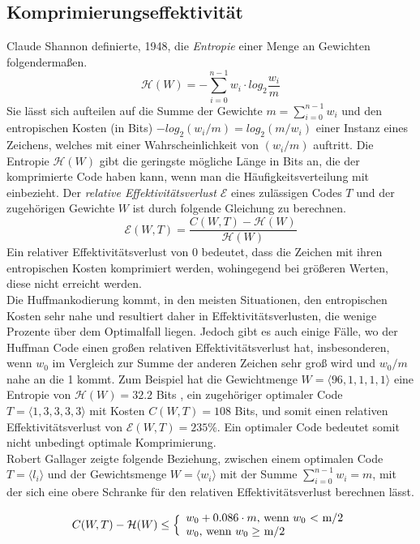 \documentclass[course=erap]{aspdoc}
\begin{document}
\subsection{Komprimierungseffektivität}

Claude Shannon definierte, 1948, die \textit{Entropie} einer Menge an Gewichten folgendermaßen. \cite{6773024}
$$ \mathcal{H}(W) = - \sum_{i=0}^{n-1} w_i \cdot log_2 \frac{w_i}{m} $$
Sie lässt sich aufteilen auf die Summe der Gewichte $m = \sum_{i=0}^{n-1} w_i$ und den entropischen Kosten (in Bits) $-log_2 (w_i/m) = log_2 (m/w_i) $ einer Instanz eines Zeichens, welches mit einer Wahrscheinlichkeit von $(w_i/m)$ auftritt.
Die Entropie $\mathcal{H}(W)$ gibt die geringste mögliche Länge in Bits an, die der komprimierte Code haben kann, wenn man die Häufigkeitsverteilung mit einbezieht.
Der \textit{relative Effektivitätsverlust} $\mathcal{E}$ eines zulässigen Codes $T$ und der zugehörigen Gewichte $W$ ist durch folgende Gleichung zu berechnen.
$$ \mathcal{E}(W, T) = \frac{C(W,T) - \mathcal{H}(W)}{\mathcal{H}(W)} $$
Ein relativer Effektivitätsverlust von 0 bedeutet, dass die Zeichen mit ihren entropischen Kosten komprimiert werden, wohingegend bei größeren Werten, diese nicht erreicht werden.\\
Die Huffmankodierung kommt, in den meisten Situationen, den entropischen Kosten sehr nahe und resultiert daher in Effektivitätsverlusten, die wenige Prozente über dem Optimalfall liegen.
Jedoch gibt es auch einige Fälle, wo der Huffman Code einen großen relativen Effektivitätsverlust hat, insbesonderen, wenn $w_0$ im Vergleich zur Summe der anderen Zeichen sehr groß wird und $w_0 / m$ nahe an die 1 kommt.
Zum Beispiel hat die Gewichtmenge $W = \langle 96, 1, 1, 1, 1 \rangle$ eine Entropie von $\mathcal{H}(W) =
32.2$ Bits , ein zugehöriger optimaler Code $T = \langle 1, 3, 3, 3, 3 \rangle$ mit Kosten $C(W ,T) = 108 $ Bits, und somit einen
relativen Effektivitätsverlust von $\mathcal{E}(W ,T ) = 235\%$. Ein optimaler Code bedeutet somit nicht unbedingt optimale Komprimierung.\\
Robert Gallager \cite{1055959} zeigte folgende Beziehung, zwischen einem optimalen Code $T = \langle l_i \rangle $ und der Gewichtsmenge $W = \langle w_i \rangle$ mit der Summe $\sum_{i=0}^{n-1} w_i = m$, mit der sich eine obere Schranke für den relativen Effektivitätsverlust berechnen lässt.

$$ C(W, T) - \mathcal{H}(W) \le \Bigl\lbrace
    \begin{array}{l}
          w_0 + 0.086 \cdot m \textrm{, wenn $w_0$ < m/2}\\
          w_0 \textrm{, wenn $w_0 \ge$ m/2}\\
    \end{array} $$
\end{document}
